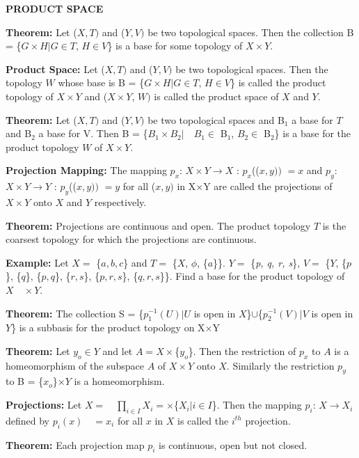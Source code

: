 \documentclass[12pt]{amsart}
\begin{document}
\textbf{PRODUCT SPACE}

\textbf{Theorem:} Let ($X, T)$ and ($Y, V)$ be two topological spaces. Then the 
collection B = {\{}$G\times H\vert G\in T$, $H\in V${\}} is a base for some 
topology of $X\times Y$.

\textbf{Product Space:} Let ($X, T)$ and ($Y, V)$ be two topological spaces. Then the 
topology $W$ whose base is B = {\{}$G\times H\vert G\in T$, $H\in V${\}} is 
called the product topology of $X\times Y$ and ($X\times Y$, $W)$ is called the 
product space of $X$ and $Y$.

\textbf{Theorem:} Let ($X, T)$ and ($Y, V)$ be two topological spaces and B$_{ 1}$ a 
base for $T$ and B$_{ 2}$ a base for V. Then B = {\{}$B_{1}\times 
B_{2}\vert  \quad B_{1}\in $ B$_{ 1}$, $B_{2}\in $ B$_{ 2}${\}} is a base 
for the product topology $W$ of $X\times Y$.

\textbf{Projection Mapping:} The mapping $p_{x }$: $X\times Y \to X$ : 
$p_{x}$(($x, y))$ $= x$ and $p_{y}$: $X\times Y \to Y$ : $p_{y}$(($x, y))$ $= y$ for all ($x, y)$ in X$\times 
$Y are called the projections of $X\times Y$ onto $X$ and $Y$ respectively.

\textbf{Theorem:} Projections are continuous and open. The product topology 
$T$ is the coarsest topology for which the projections are continuous.

\textbf{Example:} Let $X =$ {\{}$a, b, c${\}} and $T =$ {\{}$X$, $\phi $, {\{}$a${\}}{\}}. $Y =$ {\{}\textit{p, q, r, s}{\}}, 
$V =$ {\{}$Y$, {\{}$p${\}}, {\{}$q${\}}, {\{}$p, q${\}}, {\{}$r, s${\}}, {\{}$p, r, s${\}}, {\{}$q, r, s${\}}{\}}. Find 
a base for the product topology of $X \quad \times Y$.

\textbf{Theorem:} The collection S = {\{}$p_{1}^{-1}(U)\vert U$ is open in 
$X${\}}$\cup ${\{}$p_{2}^{-1}(V)\vert V$ is open in $Y${\}} is a subbasis for the 
product topology on X$\times $Y

\textbf{Theorem:} Let $y_{o}\in Y$ and let $A = X \times ${\{}$y_{o}${\}}. Then the 
restriction of $p_{x}$ to $A$ is a homeomorphism of the subspace $A$ of $X\times 
Y$ onto $X$. Similarly the restriction $p_{y}$ to B = {\{}$x_{o}${\}}$\times Y$ is 
a homeomorphism.

\textbf{Projections:} Let $X = \quad \prod\limits_{i\in I} {X_i } =\times 
${\{}$X_{i}\vert i\in I${\}}. Then the mapping $p_{i}$: $X \to X_{i}$ defined 
by $p_{i}(x) \quad = x_{i}$ for all $x$ in $X$ is called the $i^{th}$ projection.

\textbf{Theorem:} Each projection map $p_{i}$ is continuous, open but not 
closed.
\end{document}
